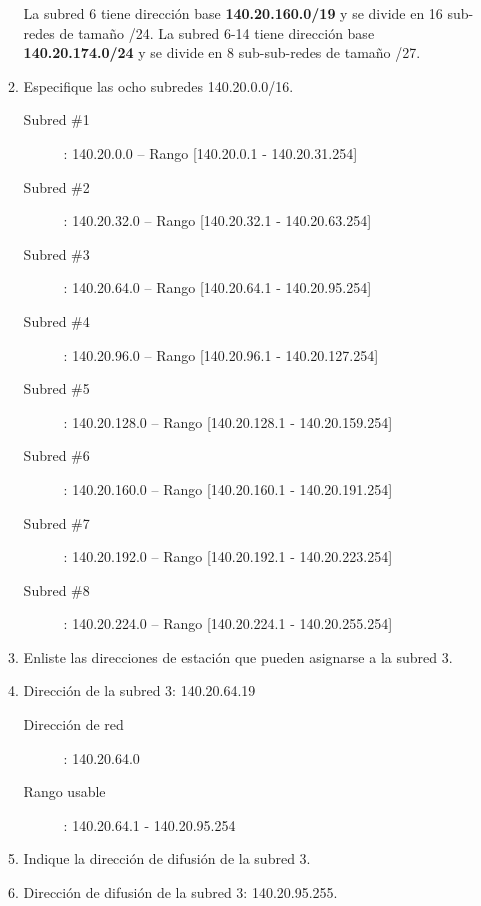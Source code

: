 \begin{enumerate}
\begin{enumerate}
        La subred 6 tiene direcci\'on base \textbf{140.20.160.0/19} y se divide en 16 sub-redes de tamaño /24.
        La subred 6-14 tiene direcci\'on base \textbf{140.20.174.0/24} y se divide en 8 sub-sub-redes de tamaño /27.        
\newpage
        \item Especifique las ocho subredes 140.20.0.0/16.
        \begin{description}
            \item[Subred \#1] : 140.20.0.0 -- Rango [140.20.0.1 - 140.20.31.254]
            \item[Subred \#2] : 140.20.32.0 -- Rango [140.20.32.1 - 140.20.63.254]
            \item[Subred \#3] : 140.20.64.0 -- Rango [140.20.64.1 - 140.20.95.254]
            \item[Subred \#4] : 140.20.96.0 -- Rango [140.20.96.1 - 140.20.127.254]
            \item[Subred \#5] : 140.20.128.0 -- Rango [140.20.128.1 - 140.20.159.254]   
            \item[Subred \#6] : 140.20.160.0 -- Rango [140.20.160.1 - 140.20.191.254]
            \item[Subred \#7] : 140.20.192.0 -- Rango [140.20.192.1 - 140.20.223.254]
            \item[Subred \#8] : 140.20.224.0 -- Rango [140.20.224.1 - 140.20.255.254]
        \end{description}

        \item Enliste las direcciones de estaci\'on que pueden asignarse a la subred 3.
        \item[] Direcci\'on de la subred 3: 140.20.64.19
        \begin{description}
            \item[Direcci\'on de red] : 140.20.64.0
            \item[Rango usable] : 140.20.64.1 - 140.20.95.254 
        \end{description}

        \item Indique la direcci\'on de difusi\'on de la subred 3.
        \item [] Direcci\'on de difusi\'on de la subred 3: 140.20.95.255.
        

\end{enumerate}
\end{enumerate}

